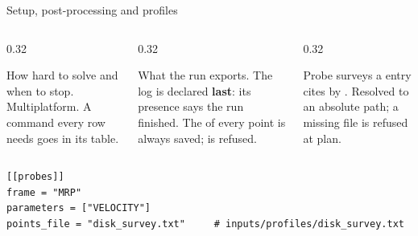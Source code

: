 \begin{frame}[fragile]{Setup, post-processing and profiles}
\begin{columns}[T]
\begin{column}{0.32\textwidth}
\begin{block}{}
\small How hard to solve and when to stop. Multiplatform. A command every row
needs goes in its \code{[[raw]]} table.
\end{block}
\end{column}
\begin{column}{0.32\textwidth}
\begin{block}{}
\small What the run exports. The log is declared \textbf{last}: its presence
says the run finished. The  of every point is always saved;
 is refused.
\end{block}
\end{column}
\begin{column}{0.32\textwidth}
\begin{block}{}
\small Probe surveys a \code{[[probes]]} entry cites by .
Resolved to an absolute path; a missing file is refused at plan.
\end{block}
\end{column}
\end{columns}
\begin{lstlisting}[style=ftsbase]
[[probes]]
frame = "MRP"
parameters = ["VELOCITY"]
points_file = "disk_survey.txt"     # inputs/profiles/disk_survey.txt
\end{lstlisting}
\end{frame}

